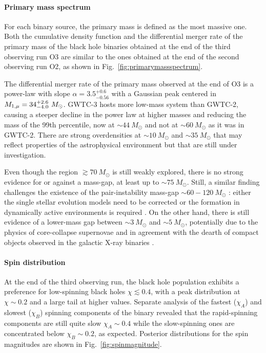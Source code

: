\documentclass[a4paper,titlepage]{book}     	%
\newcommand{\sun}{\ensuremath{_\odot}}
\newcommand{\msun}{\ensuremath{M\sun}}
\begin{document}
\paragraph{Primary mass spectrum}
For each binary source, the primary mass is defined as the most massive one. Both the cumulative density function and the differential merger rate of the primary mass of the black hole binaries obtained at the end of the third observing run O3 are similar to the ones obtained at the end of the second observing run O2, as shown in Fig.\ \ref{fig:primarymassspectrum}. \cite{GWTC-3_interpretation}

The differential merger rate of the primary mass observed at the end of O3 is a power-law with slope $\alpha = 3.5_{-0.56}^{+0.6}$ with a Gaussian peak centered in $M_{\rm 1,\mu} = 34_{-4.0}^{+2.6}~ \msun$. GWTC-3 hosts more low-mass system than GWTC-2, causing a steeper decline in the power law at higher masses and reducing the mass of the 99th percentile, now at $\sim 44~\msun$ and not at $\sim 60~\msun$ as it was in GWTC-2. There are strong overdensities at $\sim 10~\msun$ and $\sim 35~\msun$ that may reflect properties of the astrophysical environment but that are still under investigation.

Even though the region $\gtrsim 70~\msun$ is still weakly explored, there is no strong evidence for or against a mass-gap, at least up to $\sim 75~\msun$. Still, a similar finding challenges the existence of the pair-instability mass-gap $\sim 60 - 120~\msun$ \cite{spera2017_pisnSNe}: either the single stellar evolution models need to be corrected \cite{MassGapStellarEvo_Costa2021} or the formation in dynamically active environments is required \cite{Rastello2021_dynamics}. On the other hand, there is still evidence of a lower-mass gap between $\sim 3~\msun$ and $\sim 5~\msun$, potentially due to the physics of core-collapse supernovae and in agreement with the dearth of compact objects observed in the galactic X-ray binaries \cite{massgapreal_ozel2010}.




\paragraph{Spin distribution}
At the end of the third observing run, the black hole population exhibits a preference for low-spinning black holes $\chi \lesssim 0.4$, with a peak distribution at $\chi \sim 0.2$ and a large tail at higher values. Separate analysis of the fastest ($\chi_A$) and slowest ($\chi_B$) spinning components of the binary revealed that the rapid-spinning components are still quite slow $\chi_A \sim 0.4$ while the slow-spinning ones are concentrated below $\chi_B \sim 0.2$, as expected. Posterior distributions for the spin magnitudes are shown in Fig.\ \ref{fig:spinmagnitude}.
\end{document}
